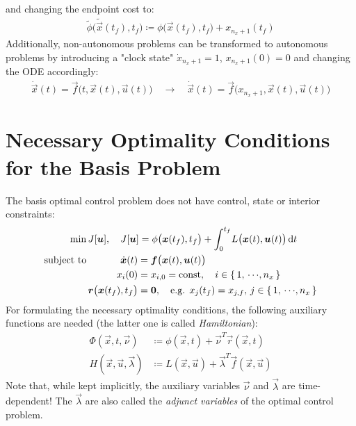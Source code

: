 	and changing the endpoint cost to:
	\begin{align*}
		\tilde{\phi}\big(\tilde{\vec{x}}(t_f), t_f\big) \coloneqq \phi\big(\vec{x}(t_f), t_f\big) + x_{n_x + 1}(t_f)
	\end{align*}
	Additionally, non-autonomous problems can be transformed to autonomous problems by introducing a "clock state" \( \dot{x}_{n_x + 1} = 1 \), \( x_{n_x + 1}(0) = 0 \) and changing the ODE accordingly:
	\begin{align*}
		\dot{\vec{x}}(t) = \vec{f}\big(t, \vec{x}(t), \vec{u}(t)\big) \quad\to\quad \dot{\vec{x}}(t) = \vec{f}\big(x_{n_x + 1}, \vec{x}(t), \vec{u}(t)\big)
	\end{align*}

	\section{Necessary Optimality Conditions for the Basis Problem}
		The basis optimal control problem does not have control, state or interior constraints:
		\begin{align*}
			\min &\, J[\bm{u}],\quad J[\bm{u}] = \phi\big(\bm{x}(t_f), t_f\big) + \int_{0}^{t_f} \! L\big(\bm{x}(t), \bm{u}(t)\big) \dd{t} \\
			\mathrm{subject~to} &\,
				\begin{alignedat}[t]{2}
					\dot{\bm{x}}(t) &= \bm{f}\big(\bm{x}(t), \bm{u}(t)\big) \\
					x_i(0) &= x_{i, 0} = \operatorname{const},\quad i \in \{\, 1,\,\cdots\!,n_x \,\} \\
					\bm{r}\big(\bm{x}(t_f), t_f\big) &= \bm{0},\quad \text{e.g. } x_j(t_f) = x_{j, f},\, j \in \{\, 1,\,\cdots\!,n_x \,\}
				\end{alignedat}
		\end{align*}
		For formulating the necessary optimality conditions, the following auxiliary functions are needed (the latter one is called \emph{Hamiltonian}):
		\begin{align*}
			\Phi(\vec{x}, t, \vec{\nu}) &\coloneqq \phi(\vec{x}, t) + \vec{\nu}^T \vec{r}(\vec{x}, t) \\
			H(\vec{x}, \vec{u}, \vec{\lambda}) &\coloneqq L(\vec{x}, \vec{u}) + \vec{\lambda}^T \vec{f}(\vec{x}, \vec{u})
		\end{align*}
		Note that, while kept implicitly, the auxiliary variables \(\vec{\nu}\) and \(\vec{\lambda}\) are time-dependent! The \(\vec{\lambda}\) are also called the \emph{adjunct variables} of the optimal control problem.

